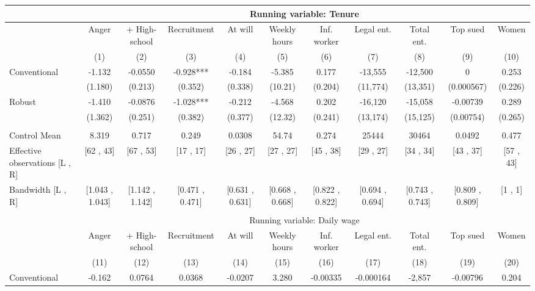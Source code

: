 \begin{tabular}{lcccccccccc}
\toprule
      & \multicolumn{10}{c}{Running variable: Tenure} \\
\midrule
      & Anger & + High-school & Recruitment & At will  & Weekly hours & Inf. worker & Legal ent. & Total ent. & Top sued & Women \\
\midrule
      & (1)   & (2)   & (3)   & (4)   & (5)   & (6)   & (7)   & (8)   & (9)   & (10) \\
\midrule
\midrule
Conventional & -1.132 & -0.0550 & -0.928*** & -0.184 & -5.385 & 0.177 & -13,555 & -12,500 & 0     & 0.253 \\
      & (1.180) & (0.213) & (0.352) & (0.338) & (10.21) & (0.204) & (11,774) & (13,351) & (0.000567) & (0.226) \\
Robust & -1.410 & -0.0876 & -1.028*** & -0.212 & -4.568 & 0.202 & -16,120 & -15,058 & -0.00739 & 0.289 \\
      & (1.362) & (0.251) & (0.382) & (0.377) & (12.32) & (0.241) & (13,174) & (15,125) & (0.00754) & (0.265) \\
      &       &       &       &       &       &       &       &       &       &  \\
\midrule
Control Mean & 8.319 & 0.717 & 0.249 & 0.0308 & 54.74 & 0.274 & 25444 & 30464 & 0.0492 & 0.477 \\
Effective observations [L , R] & [62 , 43] & [67 , 53] & [17 , 17] & [26 , 27] & [27 , 27] & [45 , 38] & [29 , 27] & [34 , 34] & [43 , 37] & [57 , 43] \\
Bandwidth [L , R] & [1.043 , 1.043] & [1.142 , 1.142] & [0.471 , 0.471] & [0.631 , 0.631] & [0.668 , 0.668] & [0.822 , 0.822] & [0.694 , 0.694] & [0.743 , 0.743] & [0.809 , 0.809] & [1 , 1] \\
\midrule
\midrule
      &       &       &       &       &       &       &       &       &       &  \\
\midrule
      & \multicolumn{10}{c}{Running variable: Daily wage} \\
\midrule
      & Anger & + High-school & Recruitment & At will  & Weekly hours & Inf. worker & Legal ent. & Total ent. & Top sued & Women \\
\midrule
      & (11)  & (12)  & (13)  & (14)  & (15)  & (16)  & (17)  & (18)  & (19)  & (20) \\
\midrule
\midrule
Conventional & -0.162 & 0.0764 & 0.0368 & -0.0207 & 3.280 & -0.00335 & -0.000164 & -2,857 & -0.00796 & 0.204 \\

\end{tabular}

